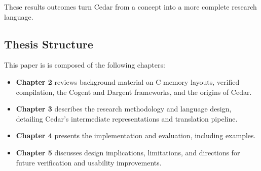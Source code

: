 These results outcomes turn Cedar from a concept into a more
complete research language.

\subsection{Thesis Structure}
This paper is is composed of the following chapters: 
\begin{itemize}
    \item \textbf{Chapter 2} reviews background material on C memory layouts,
    verified compilation, the Cogent and Dargent frameworks, and the origins
    of Cedar.
    \item \textbf{Chapter 3} describes the research methodology and language design,
    detailing Cedar's intermediate representations and translation
    pipeline.
    \item \textbf{Chapter 4} presents the implementation and evaluation,
    including examples. 
    \item \textbf{Chapter 5} discusses design implications, limitations,
    and directions for future verification and usability improvements.
    
\end{itemize}


